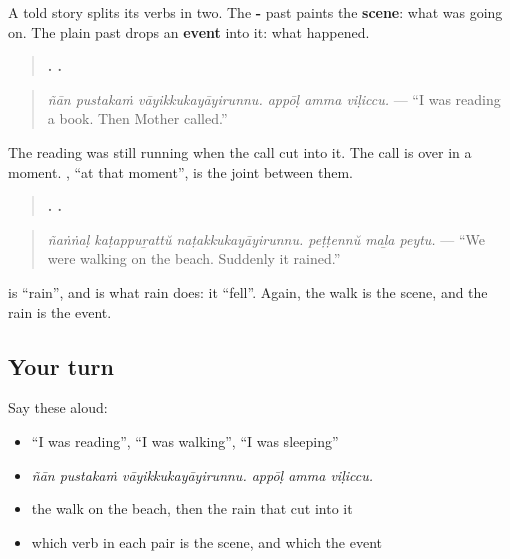\begin{grammarlens}[title={Grammar Lens: the scene, and what cut into it}]
A told story splits its verbs in two. The \textbf{-} past paints the \textbf{scene}: what was going on. The plain past drops an \textbf{event} into it: what happened.

\begin{quote}
\textbf{  .   .}
\end{quote}

\begin{quote}
\emph{ñān pustakaṁ vāyikkukayāyirunnu. appōḷ amma viḷiccu.} — \textquotedblleft{}I was reading a book. Then Mother called.\textquotedblright{}
\end{quote}

The reading was still running when the call cut into it. The call is over in a moment. \textbf{}, \textquotedblleft{}at that moment\textquotedblright{}, is the joint between them.

\begin{quote}
\textbf{  .   .}
\end{quote}

\begin{quote}
\emph{ñaṅṅaḷ kaṭappuṟattŭ naṭakkukayāyirunnu. peṭṭennŭ maḻa peytu.} — \textquotedblleft{}We were walking on the beach. Suddenly it rained.\textquotedblright{}
\end{quote}

\textbf{} is \textquotedblleft{}rain\textquotedblright{}, and \textbf{} is what rain does: it \textquotedblleft{}fell\textquotedblright{}. Again, the walk is the scene, and the rain is the event.
\end{grammarlens}

\subsection*{Your turn}
Say these aloud:

\begin{itemize}
\raggedright
  \item \textquotedblleft{}I was reading\textquotedblright{}, \textquotedblleft{}I was walking\textquotedblright{}, \textquotedblleft{}I was sleeping\textquotedblright{}
  \item \emph{ñān pustakaṁ vāyikkukayāyirunnu. appōḷ amma viḷiccu.}
  \item the walk on the beach, then the rain that cut into it
  \item which verb in each pair is the scene, and which the event
\end{itemize}

